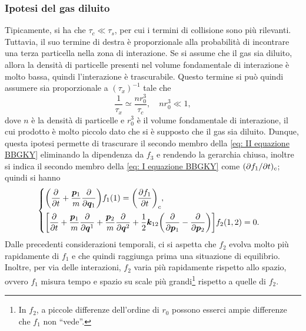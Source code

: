 \subsubsection{Ipotesi del gas diluito}
Tipicamente, si ha che $\tau_c \ll \tau_s$, per cui i termini di collisione sono più rilevanti. Tuttavia, il suo termine di destra è proporzionale alla probabilità di incontrare una terza particella nella zona di interazione. Se si assume che il gas sia diluito, allora la densità di particelle presenti nel volume fondamentale di interazione è molto bassa, quindi l'interazione è trascurabile. Questo termine si può quindi assumere sia proporzionale a $(\tau_x)^{-1}$ tale che 
\begin{equation}
    \frac{1}{\tau_x} \simeq \frac{nr_0^3}{\tau_c},\quad nr_0^3 \ll 1,
\end{equation}
dove $n$ è la densità di particelle e $r_0^3$ è il volume fondamentale di interazione, il cui prodotto è molto piccolo dato che si è supposto che il gas sia diluito. Dunque, questa ipotesi permette di trascurare il secondo membro della \eqref{eq: II equazione BBGKY} eliminando la dipendenza da $f_3$ e rendendo la gerarchia chiusa, inoltre si indica il secondo membro della \eqref{eq: I equazione BBGKY} come $(\partial f_1/\partial t)_{c}$; quindi si hanno
\begin{equation}
\label{eq: I e II equazioni BBGKY (ipotesi gas diluito)}
    \begin{cases}
        \bigg(\dfrac{\partial}{\partial t} + \dfrac{\bm{p}_1}{m}\dfrac{\partial}{\partial \bm{q}_1}\bigg)f_1(1) = \bigg(\dfrac{\partial f_1}{\partial t}\bigg)_c, \\[2.5ex]
        \bigg[\dfrac{\partial}{\partial t} + \dfrac{\bm{p}_1}{m}\dfrac{\partial}{\partial \bm{q}^1} + \dfrac{\bm{p}_2}{m}\dfrac{\partial}{\partial \bm{q}^2} + \dfrac{1}{2}\bm{k}_{12}\bigg(\dfrac{\partial}{\partial \bm{p}_1} - \dfrac{\partial}{\partial \bm{p}_2}\bigg)\bigg]f_2(1,2) = 0.
    \end{cases}
\end{equation}
Dalle precedenti considerazioni temporali, ci si aspetta che $f_2$ evolva molto più rapidamente di $f_1$ e che quindi raggiunga prima una situazione di equilibrio. Inoltre, per via delle interazioni, $f_2$ varia più rapidamente rispetto allo spazio, ovvero $f_1$ misura tempo e spazio su scale più grandi\footnote{In $f_2$, a piccole differenze dell'ordine di $r_0$ possono esserci ampie differenze che $f_1$ non ``vede''.} rispetto a quelle di $f_2$.

